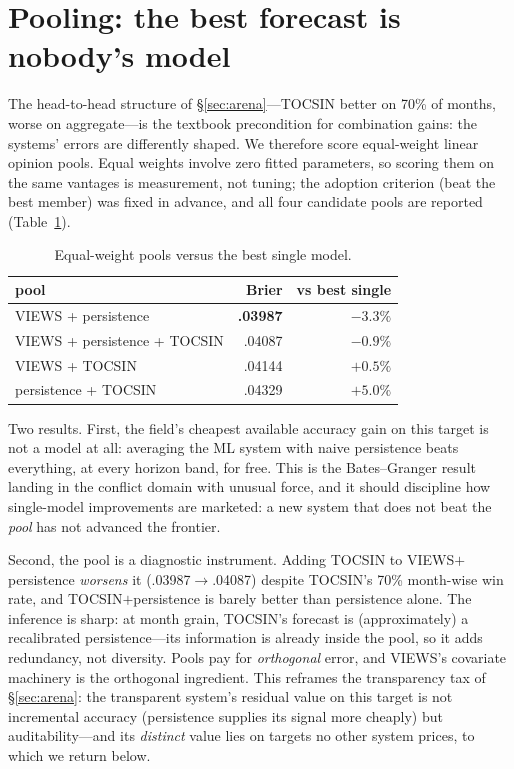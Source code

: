 \documentclass[11pt]{article}
\begin{document}
\section{Pooling: the best forecast is nobody's model}\label{sec:pools}

The head-to-head structure of \S\ref{sec:arena}---TOCSIN better on 70\% of
months, worse on aggregate---is the textbook precondition for combination
gains: the systems' errors are differently shaped. We therefore score
equal-weight linear opinion pools. Equal weights involve zero fitted
parameters, so scoring them on the same vantages is measurement, not tuning;
the adoption criterion (beat the best member) was fixed in advance, and all
four candidate pools are reported (Table~\ref{tab:pools}).

\begin{table}[t]
\centering
\caption{Equal-weight pools versus the best single model.}
\label{tab:pools}
\begin{tabular}{lrr}
\toprule
pool & Brier & vs best single \\
\midrule
VIEWS + persistence          & \textbf{.03987} & $\mathbf{-3.3\%}$ \\
VIEWS + persistence + TOCSIN & .04087 & $-0.9\%$ \\
VIEWS + TOCSIN               & .04144 & $+0.5\%$ \\
persistence + TOCSIN         & .04329 & $+5.0\%$ \\
\bottomrule
\end{tabular}
\end{table}

Two results. First, the field's cheapest available accuracy gain on this
target is not a model at all: averaging the ML system with naive persistence
beats everything, at every horizon band, for free. This is the
Bates--Granger result landing in the conflict domain with unusual force, and
it should discipline how single-model improvements are marketed: a new
system that does not beat the \emph{pool} has not advanced the frontier.

Second, the pool is a diagnostic instrument. Adding TOCSIN to
VIEWS$+$persistence \emph{worsens} it (.03987${\to}$.04087) despite TOCSIN's
70\% month-wise win rate, and TOCSIN$+$persistence is barely better than
persistence alone. The inference is sharp: at month grain, TOCSIN's forecast
is (approximately) a recalibrated persistence---its information is already
inside the pool, so it adds redundancy, not diversity. Pools pay for
\emph{orthogonal} error, and VIEWS's covariate machinery is the orthogonal
ingredient. This reframes the transparency tax of \S\ref{sec:arena}: the
transparent system's residual value on this target is not incremental
accuracy (persistence supplies its signal more cheaply) but
auditability---and its \emph{distinct} value lies on targets no other system
prices, to which we return below.
\end{document}
